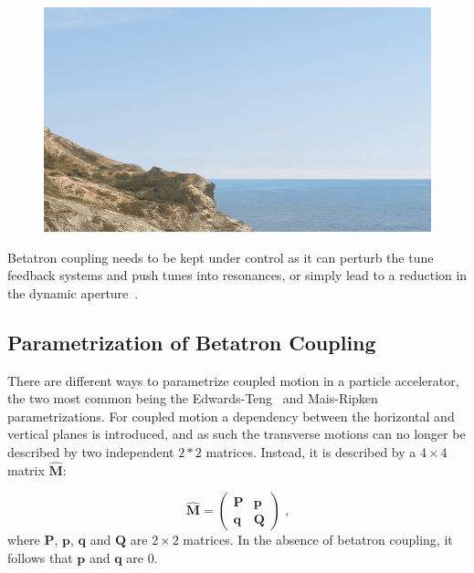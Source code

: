 \begin{figure}[!htb]
    \begin{center}
    \includegraphics[width = 0.5\linewidth]{Figures/placeholder.png}
    \caption{}
    \label{figure:skew_quadrupole}
    \end{center}
\end{figure}

Betatron coupling needs to be kept under control as it can perturb the tune feedback systems and push tunes into resonances, or simply lead to a reduction in the dynamic aperture~\cite{PA:Ripken:Impact_Linear_Coupling_Nonlinear_Dynamics}.

\subsection{Parametrization of Betatron Coupling}
\label{subsection:parametrization_of_betatron_coupling}

There are different ways to parametrize coupled motion in a particle accelerator, the two most common being the Edwards-Teng~\cite{IEEE:Edwards:Parametrization_Linear_Coupled_Motion} and Mais-Ripken~\cite{AIP:Willeke:Methods_Beam_Optics} parametrizations.
For coupled motion a dependency between the horizontal and vertical planes is introduced, and as such the transverse motions can no longer be described by two independent \(2 * 2\) matrices.
Instead, it is described by a \(4 \times 4\) matrix \(\hat{\mathbf{M}}\):

\begin{equation}
    \hat{\mathbf{M}} = \left(
        \begin{array}{ll}
            \mathbf{P} & \mathbf{p} \\
            \mathbf{q} & \mathbf{Q}
    \end{array} \right) \text{ ,}
    \label{equation:coupled_motion_matrix}
\end{equation}
where \(\mathbf{P}\), \(\mathbf{p}\), \(\mathbf{q}\) and \(\mathbf{Q}\) are \(2 \times 2\) matrices.
In the absence of betatron coupling, it follows that \(\mathbf{p}\) and \(\mathbf{q}\) are \num{0}.

